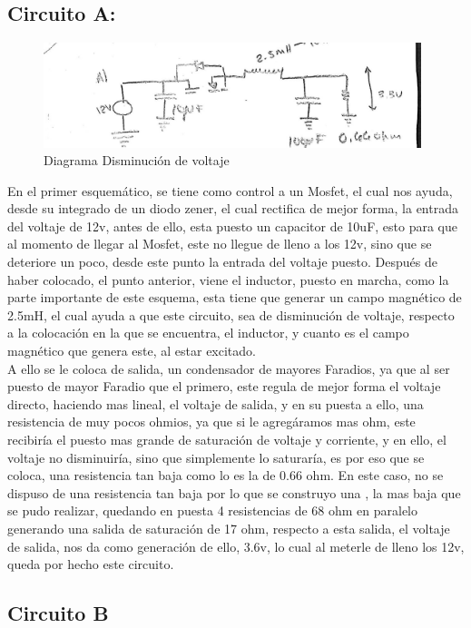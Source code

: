 \documentclass[12pt,letterpaper]{article}
\begin{document}
\subsection{Circuito A:}
\begin{figure}[h!]
\centering
\includegraphics[width=11cm]{esquema1.jpeg}
\caption{Diagrama Disminución de voltaje }
\end{figure}

En el primer esquemático, se tiene como control a un Mosfet, el cual nos ayuda, desde su integrado de un diodo zener, el cual rectifica de mejor forma, la entrada del voltaje de 12v, antes de ello, esta puesto un capacitor de 10uF, esto para que al momento de llegar al Mosfet, este no llegue de lleno a los 12v, sino que se deteriore un poco, desde este punto la entrada del voltaje puesto. Después de haber colocado, el punto anterior, viene el inductor, puesto en marcha, como la parte importante de este esquema, esta tiene que generar un campo magnético de 2.5mH, el cual ayuda a que este circuito, sea de disminución de voltaje, respecto a la colocación en la que se encuentra, el inductor, y cuanto es el campo magnético que genera este, al estar excitado.\\

A ello se le coloca de salida, un condensador de mayores Faradios, ya que al ser puesto de mayor Faradio que el primero, este regula de mejor forma el voltaje directo, haciendo mas lineal, el voltaje de salida, y en su puesta a ello, una resistencia de muy pocos ohmios, ya que si le agregáramos mas ohm, este recibiría el puesto mas grande de saturación de voltaje y corriente, y en ello, el voltaje no disminuiría, sino que simplemente lo saturaría, es por eso que se coloca, una resistencia tan baja como lo es la de 0.66 ohm. En este caso, no se dispuso de una resistencia tan baja por lo que se construyo una , la mas baja que se pudo realizar, quedando en puesta 4 resistencias de 68 ohm en paralelo generando una salida de saturación de 17 ohm, respecto a esta salida, el voltaje de salida, nos da como generación de ello, 3.6v, lo cual al meterle de lleno los 12v, queda por hecho este circuito.
\newpage
\subsection{Circuito B}
\end{document}
